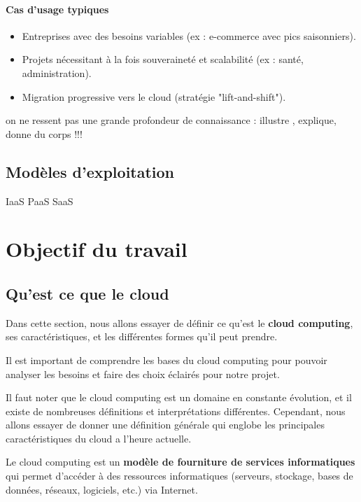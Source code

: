 \documentclass{report} %
\begin{document}
\subsubsection{Cas d’usage typiques}
\begin{itemize}
    \item Entreprises avec des besoins variables (ex : e-commerce avec pics saisonniers).
    \item Projets nécessitant à la fois souveraineté et scalabilité (ex : santé, administration).
    \item Migration progressive vers le cloud (stratégie "lift-and-shift").
\end{itemize}


{\color{red} on ne ressent pas une grande profondeur de connaissance : illustre , explique, donne du corps !!!}

{\color{red} 
\section{Modèles d'exploitation}

IaaS
PaaS
SaaS
}



\chapter{Objectif du travail}




\section{Qu'est ce que le cloud}

Dans cette section, nous allons essayer de définir ce qu'est le
\textbf{cloud computing}, ses caractéristiques, et les différentes
formes qu'il peut prendre.

Il est important de comprendre les bases du cloud computing pour
pouvoir analyser les besoins et faire des choix éclairés pour notre
projet.

Il faut noter que le cloud computing est un domaine en constante
évolution, et il existe de nombreuses définitions et interprétations
différentes. Cependant, nous allons essayer de donner une définition
générale qui englobe les principales caractéristiques du cloud a
l'heure actuelle.

Le cloud computing est un \textbf{modèle de fourniture de services
  informatiques} qui permet d'accéder à des ressources informatiques
(serveurs, stockage, bases de données, réseaux, logiciels, etc.) via
Internet.
\end{document}
